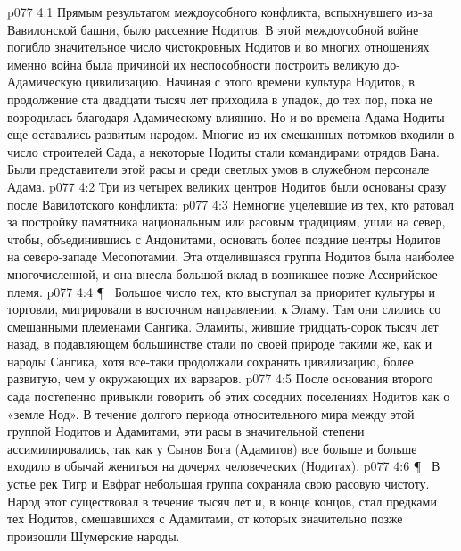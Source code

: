 \vs p077 4:1 Прямым результатом междоусобного конфликта, вспыхнувшего из\hyp{}за Вавилонской башни, было рассеяние Нодитов. В этой междоусобной войне погибло значительное число чистокровных Нодитов и во многих отношениях именно война была причиной их неспособности построить великую до\hyp{}Адамическую цивилизацию. Начиная с этого времени культура Нодитов, в продолжение ста двадцати тысяч лет приходила в упадок, до тех пор, пока не возродилась благодаря Адамическому влиянию. Но и во времена Адама Нодиты еще оставались развитым народом. Многие из их смешанных потомков входили в число строителей Сада, а некоторые Нодиты стали командирами отрядов Вана. Были представители этой расы и среди светлых умов в служебном персонале Адама.
\vs p077 4:2 Три из четырех великих центров Нодитов были основаны сразу после Вавилотского конфликта:
\vs p077 4:3 \bibnobreakspace {} Немногие уцелевшие из тех, кто ратовал за постройку памятника национальным или расовым традициям, ушли на север, чтобы, объединившись с Андонитами, основать более поздние центры Нодитов на северо\hyp{}западе Месопотамии. Эта отделившаяся группа Нодитов была наиболее многочисленной, и она внесла большой вклад в возникшее позже Ассирийское племя.
\vs p077 4:4 \P\ \bibnobreakspace {} Большое число тех, кто выступал за приоритет культуры и торговли, мигрировали в восточном направлении, к Эламу. Там они слились со смешанными племенами Сангика. Эламиты, жившие тридцать\hyp{}сорок тысяч лет назад, в подавляющем большинстве стали по своей природе такими же, как и народы Сангика, хотя все\hyp{}таки продолжали сохранять цивилизацию, более развитую, чем у окружающих их варваров.
\vs p077 4:5 После основания второго сада постепенно привыкли говорить об этих соседних поселениях Нодитов как о «земле Нод». В течение долгого периода относительного мира между этой группой Нодитов и Адамитами, эти расы в значительной степени ассимилировались, так как у Сынов Бога (Адамитов) все больше и больше входило в обычай жениться на дочерях человеческих (Нодитах).
\vs p077 4:6 \P\ \bibnobreakspace {} В устье рек Тигр и Евфрат небольшая группа сохраняла свою расовую чистоту. Народ этот существовал в течение тысяч лет и, в конце концов, стал предками тех Нодитов, смешавшихся с Адамитами, от которых значительно позже произошли Шумерские народы.

